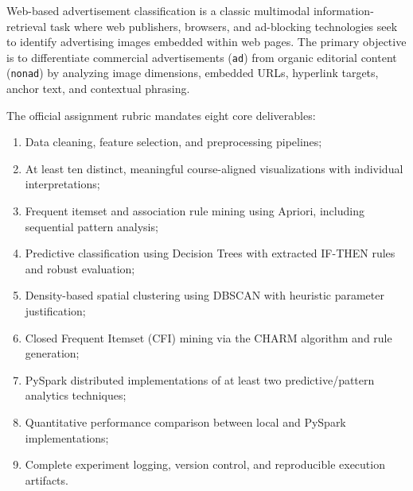 \documentclass[11pt,a4paper]{article}
\begin{document}
Web-based advertisement classification is a classic multimodal information-retrieval task where web publishers, browsers, and ad-blocking technologies seek to identify advertising images embedded within web pages. The primary objective is to differentiate commercial advertisements (\texttt{ad}) from organic editorial content (\texttt{nonad}) by analyzing image dimensions, embedded URLs, hyperlink targets, anchor text, and contextual phrasing.

The official assignment rubric mandates eight core deliverables:
\begin{enumerate}[noitemsep,topsep=2pt]
    \item Data cleaning, feature selection, and preprocessing pipelines;
    \item At least ten distinct, meaningful course-aligned visualizations with individual interpretations;
    \item Frequent itemset and association rule mining using Apriori, including sequential pattern analysis;
    \item Predictive classification using Decision Trees with extracted IF-THEN rules and robust evaluation;
    \item Density-based spatial clustering using DBSCAN with heuristic parameter justification;
    \item Closed Frequent Itemset (CFI) mining via the CHARM algorithm and rule generation;
    \item PySpark distributed implementations of at least two predictive/pattern analytics techniques;
    \item Quantitative performance comparison between local and PySpark implementations;
    \item Complete experiment logging, version control, and reproducible execution artifacts.
\end{enumerate}
\end{document}
